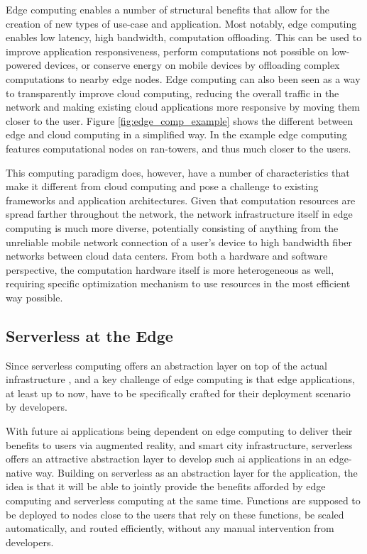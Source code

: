 Edge computing enables a number of structural benefits that allow for the creation of new types of use-case and application.
Most notably, edge computing enables low latency, high bandwidth, computation offloading.
This can be used to improve application responsiveness, perform computations not possible on low-powered devices, or conserve energy on mobile devices by offloading complex computations to nearby edge nodes\cite{abbasMobileEdgeComputing2018b}.
Edge computing can also been seen as a way to transparently improve cloud computing, reducing the overall traffic in the network and making existing cloud applications more responsive by moving them closer to the user\cite{satyanarayananEmergenceEdgeComputing2017}.
Figure \ref{fig:edge_comp_example} shows the different between edge and cloud computing in a simplified way.
In the example edge computing features computational nodes on \gls{ran}-towers, and thus much closer to the users.


This computing paradigm does, however, have a number of characteristics that make it different from cloud computing and pose a challenge to existing frameworks and application architectures.
Given that computation resources are spread  farther throughout the network, the network infrastructure itself in edge computing is much more diverse\cite{shiEdgeComputingVisionChallenges2016}, potentially consisting of anything from the unreliable mobile network connection of a user's device to high bandwidth fiber networks between cloud data centers.
From both a hardware and software perspective, the computation hardware itself is more heterogeneous as well, requiring specific optimization mechanism to use resources in the most efficient way possible\cite{abbasMobileEdgeComputing2018b}.

\subsection{Serverless at the Edge}
Since serverless computing offers an abstraction layer on top of the actual infrastructure \cite{jonasCloudProgrammingSimplified2019}, and a key challenge of edge computing is that edge applications, at least up to now, have to be specifically crafted for their deployment scenario by developers\cite{shiPromiseEdgeComputing2016}.

With future \gls{ai} applications being dependent on edge computing to deliver their benefits to users via augmented reality, and smart city infrastructure\cite{rauschEdgeIntelligenceConvergence2019}, serverless offers an attractive abstraction layer to develop such \gls{ai} applications in an edge-native way.
Building on serverless as an abstraction layer for the application, the idea is that it will be able to jointly provide the benefits afforded by edge computing and serverless computing at the same time.
Functions are supposed to be deployed to nodes close to the users that rely on these functions, be scaled automatically, and routed efficiently, without any manual intervention from developers.

